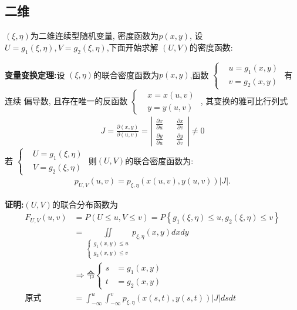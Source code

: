 \subsection{二维}
 $(\xi, \eta)$为二维连续型随机变量, 密度函数为$p(x, y)$, 设 $U = g_1(\xi, \eta), V = g_2(\xi, \eta)$,下面开始求解 $(U, V)$的密度函数:
 
{\bf 变量变换定理:}\quad 设 $(\xi, \eta)$的联合密度函数为$p(x, y)$,函数
$
\left\{
\begin{aligned}
& u=g_{1}(x, y)\\ 
& v=g_{2}(x, y)
\end{aligned}
\right.
$
有连续 偏导数, 且存在唯一的反函数
$
\left\{
\begin{aligned}
& x=x(u, v) \\ 
& y=y(u, v)
\end{aligned}
\right.
$
, 其变换的雅可比行列式
\begin{align}
{J} = \frac{\partial(x, y)}{\partial(u, v)} = \left|
\begin{aligned}
\frac{\partial x}{\partial u} && \frac{\partial x}{\partial v} \\
\frac{\partial y}{\partial u} && \frac{\partial y}{\partial v}
\end{aligned}\right| 
\neq 0
\end{align}
若 $
\left\{
\begin{aligned}
& U = g_{1}(\xi, \eta)\\ 
& V = g_{2}(\xi, \eta)
\end{aligned}
\right.
$
则$(U, V)$的联合密度函数为:
\begin{align*}
p_{\scriptscriptstyle U, V}(u, v) = p_{\xi, \eta}(x(u, v), y(u, v))|J| .
\end{align*}

{\bf 证明:}$(U, V)$的联合分布函数为
\begin{align*}
F_{U, V}(u, v)   
& = P(U \leq u, V \leq v)  = P\left\{g_{1}(\xi, \eta) \leq u, g_{2}(\xi, \eta) \leq v\right\} \\
& = \iint\limits_{\left\{\substack{g_{1}(x, y) \leq u \\ g_{2}(x, y) \leq v}\right.}p_{\xi, \eta}(x, y) d x d y \\
& \Longrightarrow \mbox{令} \left\{
\begin{aligned}
s & = g_{1}(x, y) \\
t & = g_{2}(x, y)
\end{aligned}
\right.\\
\mbox{原式} & = \int_{-\infty}^{u} \int_{-\infty}^{v} p_{\xi, \eta}(x(s, t), y(s, t))|J| d s d t
\end{align*}

